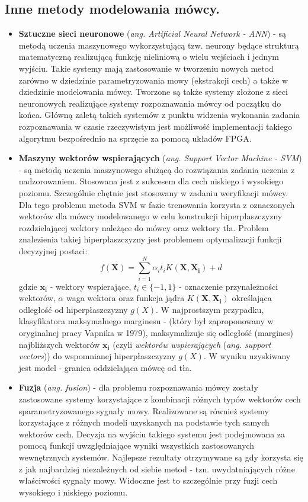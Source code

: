 \subsection{Inne metody modelowania mówcy.}
\begin{itemize}
  \item{\textbf{Sztuczne sieci neuronowe} (\textit{ang. Artificial Neural Network - ANN})} - są metodą uczenia maszynowego wykorzystującą tzw. neurony będące strukturą matematyczną realizującą funkcję nieliniową o wielu wejściach i jednym wyjściu. Takie systemy mają zastosowanie w tworzeniu nowych metod zarówno w dziedzinie parametryzowania mowy (ekstrakcji cech) a także w dziedzinie modelowania mówcy. Tworzone są także systemy złożone z sieci neuronowych realizujące systemy rozpoznawania mówcy od początku do końca. Główną zaletą takich systemów z punktu widzenia wykonania zadania rozpoznawania w czasie rzeczywistym jest możliwość implementacji takiego algorytmu bezpośrednio na sprzęcie za pomocą układów FPGA.
  \item{\textbf{Maszyny wektorów wspierających} (\textit{ang. Support Vector Machine - SVM}) \label{svm}} - są metodą uczenia maszynowego służącą do rozwiązania zadania uczenia z nadzorowaniem. Stosowana jest z sukcesem dla cech niskiego i wysokiego poziomu. Szczególnie chętnie jest stosowany w zadaniu weryfikacji mówcy. Dla tego problemu metoda SVM w fazie trenowania korzysta z oznaczonych wektorów dla mówcy modelowanego w celu konstrukcji hiperpłaszczyzny rozdzielającej wektory należące do mówcy oraz wektory tła. Problem znalezienia takiej hiperpłaszczyzny jest problemem optymalizacji funkcji decyzyjnej postaci:
\begin{equation}
  f(\bm{X}) =\sum^N_{i=1}\alpha_it_iK(\bm{X},\bm{X_i}) + d
\end{equation}
    gdzie $\bm{x_i}$ - wektory wspierające, $t_i \in \{-1,1\}$ - oznaczenie przynależności wektorów, $\alpha$ waga wektora oraz funkcja jądra $K(\bm{X},\bm{X_i})$ określająca odległość od hiperpłaszczyzny $g(X)$.
    W najprostszym przypadku, klasyfikatora maksymalnego marginesu - (który był zaproponowany w oryginalnej pracy Vapnika w 1979),  maksymalizuje się odległość (margines) najbliższych wektorów $\bm{x_i}$ (czyli \textit{wektorów wspierających}  (\textit{ang. support vectors})) do wspomnianej hiperpłaszczyzny  $g(X)$. W wyniku uzyskiwany jest model - granica oddzielająca mówcę od tła.
  \item{\textbf{Fuzja} (\textit{ang. fusion})} - dla problemu rozpoznawania mówcy zostały zastosowane systemy korzystające z kombinacji różnych typów wektorów cech sparametryzowanego sygnały mowy. Realizowane są również systemy korzystające z różnych modeli uzyskanych na podstawie tych samych wektorów cech. Decyzja na wyjściu takiego systemu jest podejmowana za pomocą funkcji uwzględniające wyniki wszystkich zastosowanych wewnętrznych systemów. Najlepsze rezultaty otrzymywane są gdy korzysta się z jak najbardziej niezależnych od siebie metod - tzn. uwydatniających różne właściwości sygnały mowy. Widoczne jest to szczególnie przy fuzji cech wysokiego i niskiego poziomu.
\end{itemize}
